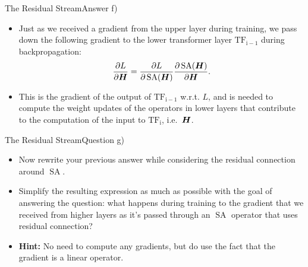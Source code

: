 \documentclass[t]{beamer}
\newcommand\op[1]{\operatorname{#1}}
\begin{document}
\begin{frame}{The Residual Stream}{Answer f)}
    \begin{itemize}
        \item Just as we received a gradient from the upper layer during
              training, we pass down the following gradient to the lower
              transformer layer $\op{TF_{i-1}}$ during backpropagation:
              \begin{align}\label{eq:input_gradient}
                  \frac{\partial L}{\partial \mH} = \frac{\partial L}{\partial \op{SA}(\mH)}\frac{\partial \op{SA}(\mH)}{\partial \mH}.
              \end{align}
        \item This is the gradient of the output of $\op{TF_{i-1}}$ w.r.t. $L$,
              and is needed to compute the weight updates of the operators in
              lower layers that contribute to the computation of the input to
              $\op{TF_i}$, i.e.\ ${\boldsymbol{H}}$.
    \end{itemize}
\end{frame}

\begin{frame}{The Residual Stream}{Question g)}
    \begin{itemize}
        \item Now rewrite your previous answer while considering the residual
              connection around $\op{SA}$.
        \item Simplify the resulting expression as much as possible with the
              goal of answering the question: what happens during training to
              the gradient that we received from higher layers as it's passed
              through an $\op{SA}$ operator that uses residual connection?
        \item \textbf{Hint:} No need to compute any gradients, but do use the
              fact that the gradient is a linear operator.
    \end{itemize}
\end{frame}
\end{document}

